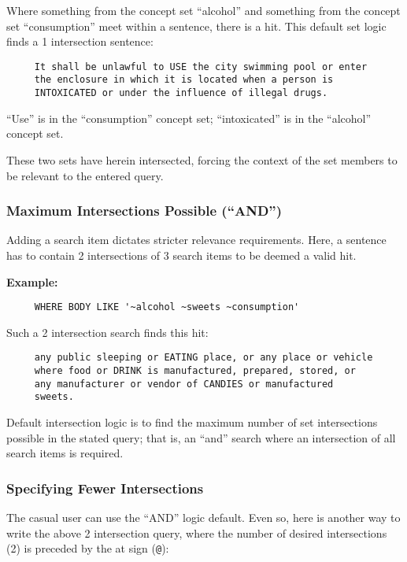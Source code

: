 Where something from the concept set ``alcohol'' and something from
the concept set ``consumption'' meet within a sentence, there is a
hit.  This default set logic finds a 1 intersection sentence:

\begin{verbatim}
     It shall be unlawful to USE the city swimming pool or enter
     the enclosure in which it is located when a person is
     INTOXICATED or under the influence of illegal drugs.
\end{verbatim}

``Use'' is in the ``consumption'' concept set; ``intoxicated'' is in
the ``alcohol'' concept set.

These two sets have herein intersected, forcing the context of the set
members to be relevant to the entered query.

\subsubsection{Maximum Intersections Possible (``AND'')}

Adding a search item dictates stricter relevance requirements.  Here,
a sentence has to contain 2 intersections of 3 search items to be
deemed a valid hit.

{\bf Example:}
\begin{verbatim}
     WHERE BODY LIKE '~alcohol ~sweets ~consumption'
\end{verbatim}

Such a 2 intersection search finds this hit:

\begin{verbatim}
     any public sleeping or EATING place, or any place or vehicle
     where food or DRINK is manufactured, prepared, stored, or
     any manufacturer or vendor of CANDIES or manufactured
     sweets.
\end{verbatim}

Default intersection logic is to find the maximum number of set
intersections possible in the stated query; that is, an ``and'' search
where an intersection of all search items is required.

\subsubsection{Specifying Fewer Intersections}

The casual user can use the ``AND'' logic default.  Even so, here is
another way to write the above 2 intersection query, where the number
of desired intersections (2) is preceded by the at sign (\verb`@`):

